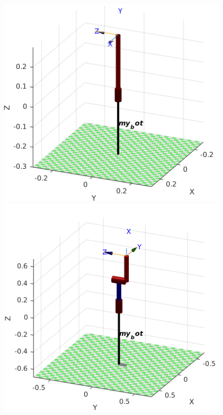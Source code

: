 \documentclass{article}
\begin{document}
\begin{center}
\begin{figure}[!htb]
   \begin{minipage}{0.33\textwidth}
     \centering
     \includegraphics[width=\linewidth]{images/3-dof/frame1.png}
   \end{minipage}\hfill
   \begin{minipage}{0.33\textwidth}
     \centering
     \includegraphics[width=\linewidth]{images/3-dof/frame2_q2_90.png}

\end{minipage}
\end{figure}
\end{center}
\end{document}
